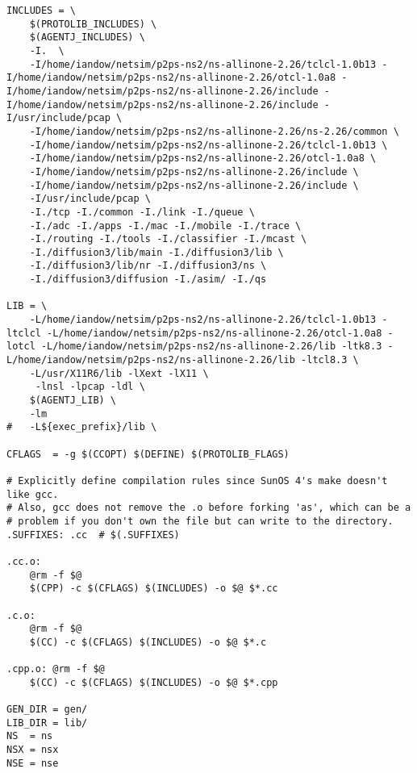 \begin{verbatim}
INCLUDES = \
	$(PROTOLIB_INCLUDES) \
	$(AGENTJ_INCLUDES) \
	-I.  \
	-I/home/iandow/netsim/p2ps-ns2/ns-allinone-2.26/tclcl-1.0b13 -I/home/iandow/netsim/p2ps-ns2/ns-allinone-2.26/otcl-1.0a8 -I/home/iandow/netsim/p2ps-ns2/ns-allinone-2.26/include -I/home/iandow/netsim/p2ps-ns2/ns-allinone-2.26/include -I/usr/include/pcap \
	-I/home/iandow/netsim/p2ps-ns2/ns-allinone-2.26/ns-2.26/common \
	-I/home/iandow/netsim/p2ps-ns2/ns-allinone-2.26/tclcl-1.0b13 \
	-I/home/iandow/netsim/p2ps-ns2/ns-allinone-2.26/otcl-1.0a8 \
	-I/home/iandow/netsim/p2ps-ns2/ns-allinone-2.26/include \
	-I/home/iandow/netsim/p2ps-ns2/ns-allinone-2.26/include \
	-I/usr/include/pcap \
	-I./tcp -I./common -I./link -I./queue \
	-I./adc -I./apps -I./mac -I./mobile -I./trace \
	-I./routing -I./tools -I./classifier -I./mcast \
	-I./diffusion3/lib/main -I./diffusion3/lib \
	-I./diffusion3/lib/nr -I./diffusion3/ns \
	-I./diffusion3/diffusion -I./asim/ -I./qs

LIB	= \
	-L/home/iandow/netsim/p2ps-ns2/ns-allinone-2.26/tclcl-1.0b13 -ltclcl -L/home/iandow/netsim/p2ps-ns2/ns-allinone-2.26/otcl-1.0a8 -lotcl -L/home/iandow/netsim/p2ps-ns2/ns-allinone-2.26/lib -ltk8.3 -L/home/iandow/netsim/p2ps-ns2/ns-allinone-2.26/lib -ltcl8.3 \
	-L/usr/X11R6/lib -lXext -lX11 \
	 -lnsl -lpcap -ldl \
	$(AGENTJ_LIB) \
	-lm 
#	-L${exec_prefix}/lib \

CFLAGS	= -g $(CCOPT) $(DEFINE) $(PROTOLIB_FLAGS)

# Explicitly define compilation rules since SunOS 4's make doesn't like gcc.
# Also, gcc does not remove the .o before forking 'as', which can be a
# problem if you don't own the file but can write to the directory.
.SUFFIXES: .cc	# $(.SUFFIXES)

.cc.o:
	@rm -f $@
	$(CPP) -c $(CFLAGS) $(INCLUDES) -o $@ $*.cc

.c.o:
	@rm -f $@
	$(CC) -c $(CFLAGS) $(INCLUDES) -o $@ $*.c

.cpp.o: @rm -f $@ 
	$(CC) -c $(CFLAGS) $(INCLUDES) -o $@ $*.cpp

GEN_DIR	= gen/
LIB_DIR	= lib/
NS	= ns
NSX	= nsx
NSE	= nse


\end{verbatim}

